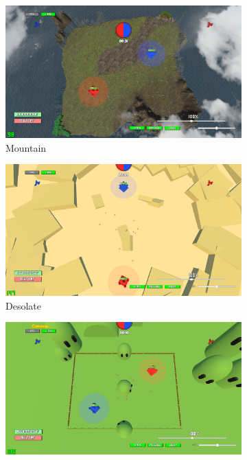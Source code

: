 \documentclass{report}
\begin{document}
\paragraph{}
\begin{figure}
\begin{adjustwidth}{-8em}{-7em}
\begin{subfigure}{.5\textwidth}
  \includegraphics[scale=0.1]{DATA/montagne.png}
  \caption{Mountain}
  \label{fig:sfig1}
\end{subfigure}%
\begin{subfigure}{.5\textwidth}
  \centering
  \includegraphics[scale=0.1]{DATA/desolate.png}
  \caption{Desolate}
  \label{fig:sfig2}
\end{subfigure}
\begin{subfigure}{.5\textwidth}
  \centering
  \includegraphics[scale=0.1]{DATA/plaine.png}

\end{subfigure}
\end{adjustwidth}
\end{figure}
\end{document}
